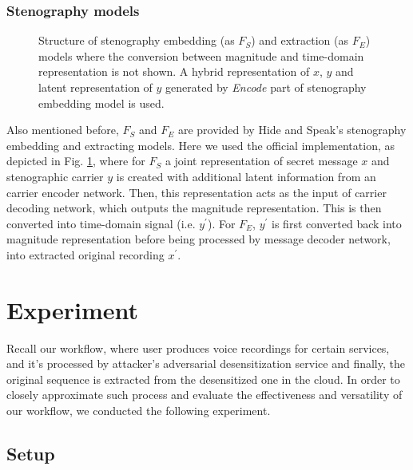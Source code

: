 \documentclass[journal]{IEEEtran} %
\begin{document}
\subsubsection{Stenography models}

\begin{figure}[!t]
    \caption{Structure of stenography embedding (as $F_S$) and extraction (as $F_E$) models where the conversion between magnitude and time-domain representation is not shown. A hybrid representation of $x$, $y$ and latent representation of $y$ generated by \textit{Encode} part of stenography embedding model is used.}
    \label{fig:steno_impl}
\end{figure}

Also mentioned before, $F_S$ and $F_E$ are provided by Hide and Speak's stenography embedding and extracting models. Here we used the official implementation, as depicted in Fig. \ref{fig:steno_impl}, where for $F_S$ a joint representation of secret message $x$ and stenographic carrier $y$ is created with additional latent information from an carrier encoder network. Then, this representation acts as the input of carrier decoding network, which outputs the magnitude representation. This is then converted into time-domain signal (i.e. $y^{\prime}$). For $F_E$, $y^{\prime}$ is first converted back into magnitude representation before being processed by message decoder network, into extracted original recording $x^{\prime}$.

\section{Experiment}
\label{seg:expriment}

Recall our workflow, where user produces voice recordings for certain services, and it's processed by attacker's adversarial desensitization service and finally, the original sequence is extracted from the desensitized one in the cloud. In order to closely approximate such process and evaluate the effectiveness and versatility of our workflow, we conducted the following experiment.

\subsection{Setup}
\end{document}
